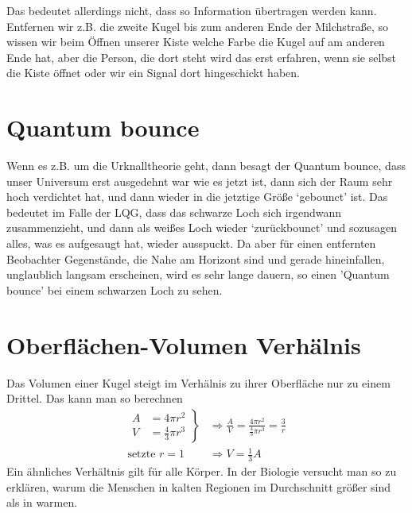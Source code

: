 \documentclass[ngerman]{scrartcl}
\begin{document}
	Das bedeutet allerdings nicht, dass so Information übertragen werden kann. Entfernen wir z.B. die zweite Kugel bis zum anderen Ende der Milchstraße, so wissen wir beim Öffnen unserer Kiste welche Farbe die Kugel auf am anderen Ende hat, aber die Person, die dort steht wird das erst erfahren, wenn sie selbst die Kiste öffnet oder wir ein Signal dort hingeschickt haben.

\section{Quantum bounce} \label{QuantumBounce}
	Wenn es z.B. um die Urknalltheorie geht, dann besagt der Quantum bounce, dass unser Universum erst ausgedehnt war wie es jetzt ist, dann sich der Raum sehr hoch verdichtet hat, und dann wieder in die jetztige Größe `gebounct' ist. Das bedeutet im Falle der LQG, dass das schwarze Loch sich irgendwann zusammenzieht, und dann als weißes Loch wieder `zurückbounct' und sozusagen alles, was es aufgesaugt hat, wieder ausspuckt. Da aber für einen entfernten Beobachter Gegenstände, die Nahe am Horizont sind und gerade hineinfallen, unglaublich langsam erscheinen, wird es sehr lange dauern, so einen 'Quantum bounce' bei einem schwarzen Loch zu sehen.  

\section{Oberflächen-Volumen Verhälnis} \label{O/V-Verhaeltnis}
	Das Volumen einer Kugel steigt im Verhälnis zu ihrer Oberfläche nur zu einem Drittel.
	Das kann man so berechnen
		\begin{align*}
			\left.
			\begin{aligned}
			A &= 4 \pi r^2 \\
			V &= \frac{4}{3} \pi r^3 
			\end{aligned}
			\right\}
			&\Rightarrow 
			\frac{A}{V} = \frac{4 \pi r^2}{\frac{4}{3} \pi r^3} = \frac{3}{r} \\
			\text{setzte }r = 1 &\Rightarrow V = \frac{1}{3} A			
		\end{align*}
	Ein ähnliches Verhältnis gilt für alle Körper. In der Biologie versucht man so zu erklären, warum die Menschen in kalten Regionen im Durchschnitt größer sind als in warmen. 
\end{document}
